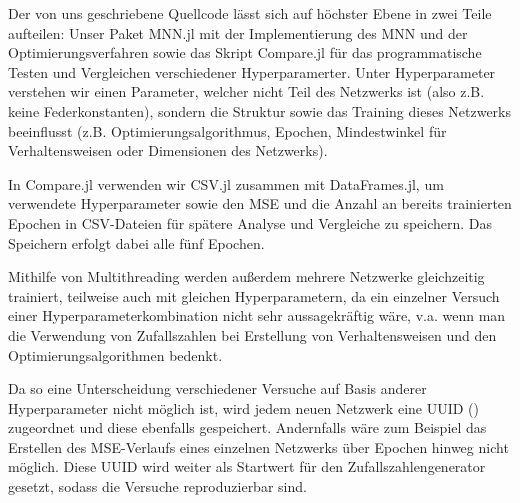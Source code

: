 
Der von uns geschriebene Quellcode lässt sich auf höchster Ebene in zwei Teile aufteilen: Unser Paket MNN.jl mit der Implementierung des MNN und der Optimierungsverfahren sowie das Skript Compare.jl für das programmatische Testen und Vergleichen verschiedener Hyperparamerter.
Unter Hyperparameter verstehen wir einen Parameter, welcher nicht Teil des Netzwerks ist (also z.B. keine Federkonstanten), sondern die Struktur sowie das Training dieses Netzwerks beeinflusst (z.B. Optimierungsalgorithmus, Epochen, Mindestwinkel für Verhaltensweisen oder Dimensionen des Netzwerks). 

In Compare.jl verwenden wir CSV.jl zusammen mit DataFrames.jl, um verwendete Hyperparameter sowie den MSE und die Anzahl an bereits trainierten Epochen in CSV-Dateien für spätere Analyse und Vergleiche zu speichern. 
Das Speichern erfolgt dabei alle fünf Epochen.

Mithilfe von Multithreading werden außerdem mehrere Netzwerke gleichzeitig trainiert, teilweise auch mit gleichen Hyperparametern, da ein einzelner Versuch einer Hyperparameterkombination nicht sehr aussagekräftig wäre, v.a. wenn man die Verwendung von Zufallszahlen bei Erstellung von Verhaltensweisen und den Optimierungsalgorithmen bedenkt.

Da so eine Unterscheidung verschiedener Versuche auf Basis anderer Hyperparameter nicht möglich ist, wird jedem neuen Netzwerk eine UUID ()
zugeordnet und diese ebenfalls gespeichert.
Andernfalls wäre zum Beispiel das Erstellen des MSE-Verlaufs eines einzelnen Netzwerks über Epochen hinweg nicht möglich.
Diese UUID wird weiter als Startwert für den Zufallszahlengenerator gesetzt, sodass die Versuche reproduzierbar sind.

